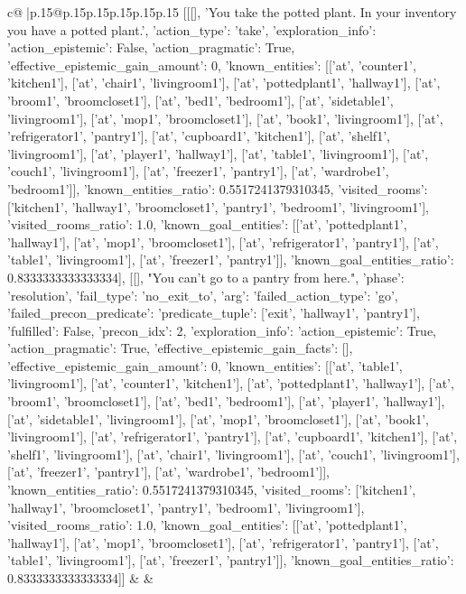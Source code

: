 \documentclass{article}
\begin{document}
{\begin{supertabular}{c@{$\;$}|p{.15\linewidth}@{}p{.15\linewidth}p{.15\linewidth}p{.15\linewidth}p{.15\linewidth}p{.15\linewidth}}
{{{	 [[[], 'You take the potted plant. In your inventory you have a potted plant.', {'action_type': 'take', 'exploration_info': {'action_epistemic': False, 'action_pragmatic': True, 'effective_epistemic_gain_amount': 0, 'known_entities': [['at', 'counter1', 'kitchen1'], ['at', 'chair1', 'livingroom1'], ['at', 'pottedplant1', 'hallway1'], ['at', 'broom1', 'broomcloset1'], ['at', 'bed1', 'bedroom1'], ['at', 'sidetable1', 'livingroom1'], ['at', 'mop1', 'broomcloset1'], ['at', 'book1', 'livingroom1'], ['at', 'refrigerator1', 'pantry1'], ['at', 'cupboard1', 'kitchen1'], ['at', 'shelf1', 'livingroom1'], ['at', 'player1', 'hallway1'], ['at', 'table1', 'livingroom1'], ['at', 'couch1', 'livingroom1'], ['at', 'freezer1', 'pantry1'], ['at', 'wardrobe1', 'bedroom1']], 'known_entities_ratio': 0.5517241379310345, 'visited_rooms': ['kitchen1', 'hallway1', 'broomcloset1', 'pantry1', 'bedroom1', 'livingroom1'], 'visited_rooms_ratio': 1.0, 'known_goal_entities': [['at', 'pottedplant1', 'hallway1'], ['at', 'mop1', 'broomcloset1'], ['at', 'refrigerator1', 'pantry1'], ['at', 'table1', 'livingroom1'], ['at', 'freezer1', 'pantry1']], 'known_goal_entities_ratio': 0.8333333333333334}}], [[], "You can't go to a pantry from here.", {'phase': 'resolution', 'fail_type': 'no_exit_to', 'arg': {'failed_action_type': 'go', 'failed_precon_predicate': {'predicate_tuple': ['exit', 'hallway1', 'pantry1'], 'fulfilled': False, 'precon_idx': 2}}, 'exploration_info': {'action_epistemic': True, 'action_pragmatic': True, 'effective_epistemic_gain_facts': [], 'effective_epistemic_gain_amount': 0, 'known_entities': [['at', 'table1', 'livingroom1'], ['at', 'counter1', 'kitchen1'], ['at', 'pottedplant1', 'hallway1'], ['at', 'broom1', 'broomcloset1'], ['at', 'bed1', 'bedroom1'], ['at', 'player1', 'hallway1'], ['at', 'sidetable1', 'livingroom1'], ['at', 'mop1', 'broomcloset1'], ['at', 'book1', 'livingroom1'], ['at', 'refrigerator1', 'pantry1'], ['at', 'cupboard1', 'kitchen1'], ['at', 'shelf1', 'livingroom1'], ['at', 'chair1', 'livingroom1'], ['at', 'couch1', 'livingroom1'], ['at', 'freezer1', 'pantry1'], ['at', 'wardrobe1', 'bedroom1']], 'known_entities_ratio': 0.5517241379310345, 'visited_rooms': ['kitchen1', 'hallway1', 'broomcloset1', 'pantry1', 'bedroom1', 'livingroom1'], 'visited_rooms_ratio': 1.0, 'known_goal_entities': [['at', 'pottedplant1', 'hallway1'], ['at', 'mop1', 'broomcloset1'], ['at', 'refrigerator1', 'pantry1'], ['at', 'table1', 'livingroom1'], ['at', 'freezer1', 'pantry1']], 'known_goal_entities_ratio': 0.8333333333333334}}]] 
	  } 
	   } 
	   } 
	 & & \\ 
 


\end{supertabular}}
\end{document}
